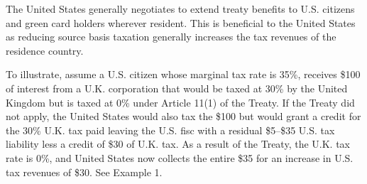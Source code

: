 The United States generally negotiates to extend treaty benefits to U.S. citizens and green card holders wherever resident.  This is beneficial to the United States as reducing source basis taxation generally increases the tax revenues of the residence country.  

To illustrate, assume a U.S. citizen whose marginal tax rate is 35\%, receives \$100 of interest from a U.K. corporation that would be taxed at 30\% by the United Kingdom but is taxed at 0\% under Article 11(1) of the Treaty.  If the Treaty did not apply, the United States would also tax the \$100 but would grant a credit for the 30\% U.K. tax paid leaving the U.S. fisc with a residual \$5--\$35 U.S. tax liability less a credit of \$30 of U.K. tax.  As a result of the Treaty, the U.K. tax rate is 0\%, and United States now collects the entire \$35 for an increase in U.S. tax revenues of \$30.  See Example 1.

